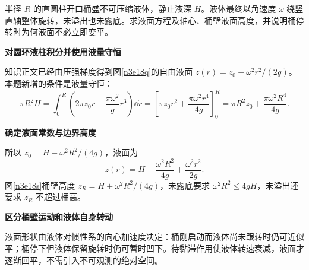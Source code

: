 \begin{question}\begin{example}[旋转水桶的液面与液量约束]\label{n3e18}
半径 $R$ 的直圆柱开口桶盛不可压缩液体，静止液深 $H$。液体最终以角速度 $\omega$ 绕竖直轴整体旋转，未溢出也未露底。求液面方程及轴心、桶壁液面高度，并说明桶停转时为何液面不必立即变平。
\end{example}\end{question}
\begin{solution}\textbf{对圆环液柱积分并使用液量守恒}\par\nobreak
知识正文已经由压强梯度得到图\ref{n3e18q}的自由液面 $z(r)=z_0+\omega^2r^2/(2g)$。本题新增的条件是液量守恒：
\[
 \pi R^2H=\int_0^R\left(2\pi z_0r+\frac{\pi\omega^2}{g}r^3\right)\dd r
 =\left[\pi z_0r^2+\frac{\pi\omega^2r^4}{4g}\right]_0^R
 =\pi R^2z_0+\frac{\pi\omega^2R^4}{4g}.
\]


\par\medskip{}\noindent\textbf{确定液面常数与边界高度}\par\nobreak
所以 $z_0=H-\omega^2R^2/(4g)$，液面为
\[z(r)=H-\frac{\omega^2R^2}{4g}+\frac{\omega^2r^2}{2g}.\]
图\ref{n3e18s}桶壁高度 $z_R=H+\omega^2R^2/(4g)$，未露底要求 $\omega^2R^2\le4gH$，未溢出还要求 $z_R$ 不超过桶高。

\par\medskip{}\noindent\textbf{区分桶壁运动和液体自身转动}\par\nobreak
液面形状由液体对惯性系的向心加速度决定：桶刚启动而液体尚未跟转时仍可近似平；桶停下但液体保留旋转时仍可暂时凹下。待黏滞作用使液体转速衰减，液面才逐渐回平，不需引入不可观测的绝对空间。
\end{solution}

